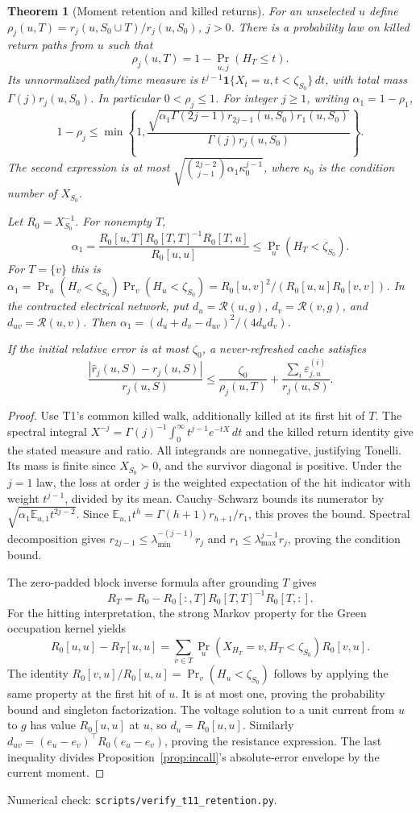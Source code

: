 \documentclass[11pt]{article}
\newtheorem{theorem}{Theorem}
\newcommand{\E}{\mathbb E}
\begin{document}
\begin{theorem}[Moment retention and killed returns]\label{thm:retention}
For an unselected $u$ define
$\rho_j(u,T)=r_j(u,S_0\cup T)/r_j(u,S_0)$, $j>0$.
There is a probability law on killed return paths from $u$ such that
\[
 \rho_j(u,T)=1-\Pr_{u,j}(H_T\leq t).
\]
Its unnormalized path/time measure is
$t^{j-1}\mathbf1\{X_t=u,t<\zeta_{S_0}\}\,dt$, with total
mass $\Gamma(j)r_j(u,S_0)$. In particular $0<\rho_j\leq1$.
For integer $j\geq1$, writing $\alpha_1=1-\rho_1$,
\[
 1-\rho_j\leq
 \min\left\{1,
 \frac{\sqrt{\alpha_1\Gamma(2j-1)r_{2j-1}(u,S_0)r_1(u,S_0)}}
      {\Gamma(j)r_j(u,S_0)}\right\}.
\]
The second expression is at most
$\sqrt{\binom{2j-2}{j-1}\alpha_1\kappa_0^{j-1}}$,
where $\kappa_0$ is the condition number of $X_{S_0}$.

Let $R_0=X_{S_0}^{-1}$. For nonempty $T$,
\[
 \alpha_1=
 \frac{R_0[u,T]R_0[T,T]^{-1}R_0[T,u]}{R_0[u,u]}
 \leq\Pr_u(H_T<\zeta_{S_0}).
\]
For $T=\{v\}$ this is
$\alpha_1=\Pr_u(H_v<\zeta_{S_0})\Pr_v(H_u<\zeta_{S_0})
=R_0[u,v]^2/(R_0[u,u]R_0[v,v])$.
In the contracted electrical network, put
$d_u=\mathcal R(u,g)$, $d_v=\mathcal R(v,g)$, and
$d_{uv}=\mathcal R(u,v)$. Then
$\alpha_1=(d_u+d_v-d_{uv})^2/(4d_ud_v)$.

If the initial relative error is at most $\zeta_0$, a
never-refreshed cache satisfies
\[
 \frac{|\widehat r_j(u,S)-r_j(u,S)|}{r_j(u,S)}
 \leq\frac{\zeta_0}{\rho_j(u,T)}+
       \frac{\sum_i\varepsilon_{j,u}^{(i)}}{r_j(u,S)}.
\]
\end{theorem}
\begin{proof}
Use T1's common killed walk, additionally killed at its first hit of
$T$. The spectral integral
$X^{-j}=\Gamma(j)^{-1}\int_0^\infty t^{j-1}e^{-tX}\,dt$
and the killed return identity give the stated measure and ratio.
All integrands are nonnegative, justifying Tonelli. Its mass is
finite since $X_{S_0}\succ0$, and the survivor diagonal is positive.
Under the $j=1$ law, the loss at order $j$ is the weighted
expectation of the hit indicator with weight $t^{j-1}$, divided
by its mean. Cauchy--Schwarz bounds its numerator by
$\sqrt{\alpha_1\E_{u,1}t^{2j-2}}$.
Since $\E_{u,1}t^h=\Gamma(h+1)r_{h+1}/r_1$, this proves the
bound. Spectral decomposition gives
$r_{2j-1}\leq\lambda_{\min}^{-(j-1)}r_j$ and
$r_1\leq\lambda_{\max}^{j-1}r_j$, proving the condition bound.

The zero-padded block inverse formula after grounding $T$ gives
\[
 R_T=R_0-R_0[:,T]R_0[T,T]^{-1}R_0[T,:].
\]
For the hitting interpretation, the strong Markov property for
the Green occupation kernel yields
\[
 R_0[u,u]-R_T[u,u]
 =\sum_{v\in T}\Pr_u(X_{H_T}=v,H_T<\zeta_{S_0})R_0[v,u].
\]
The identity $R_0[v,u]/R_0[u,u]=\Pr_v(H_u<\zeta_{S_0})$
follows by applying the same property at the first hit of $u$.
It is at most one, proving the probability bound and singleton
factorization. The voltage solution to a unit current from $u$
to $g$ has value $R_0[u,u]$ at $u$, so $d_u=R_0[u,u]$.
Similarly $d_{uv}=(e_u-e_v)^\top R_0(e_u-e_v)$, proving the
resistance expression. The last inequality divides
Proposition~\ref{prop:incall}'s absolute-error envelope by the
current moment.
\end{proof}
\noindent Numerical check: \texttt{scripts/verify\_t11\_retention.py}.
\end{document}
